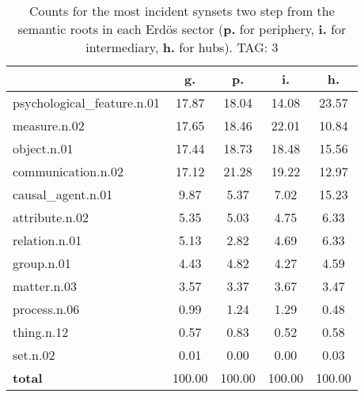\begin{table}[h!]
\begin{center}
\begin{tabular}{| l | c | c | c | c |}\hline
 & g. & p. & i. & h. \\\hline
psychological\_feature.n.01 & 17.87  & 18.04  & 14.08  & 23.57 \\\hline
measure.n.02 & 17.65  & 18.46  & 22.01  & 10.84 \\\hline
object.n.01 & 17.44  & 18.73  & 18.48  & 15.56 \\\hline
communication.n.02 & 17.12  & 21.28  & 19.22  & 12.97 \\\hline
causal\_agent.n.01 & 9.87  & 5.37  & 7.02  & 15.23 \\\hline
attribute.n.02 & 5.35  & 5.03  & 4.75  & 6.33 \\\hline
relation.n.01 & 5.13  & 2.82  & 4.69  & 6.33 \\\hline
group.n.01 & 4.43  & 4.82  & 4.27  & 4.59 \\\hline
matter.n.03 & 3.57  & 3.37  & 3.67  & 3.47 \\\hline
process.n.06 & 0.99  & 1.24  & 1.29  & 0.48 \\\hline
thing.n.12 & 0.57  & 0.83  & 0.52  & 0.58 \\\hline
set.n.02 & 0.01  & 0.00  & 0.00  & 0.03 \\\hline
{{\bf total}} & 100.00  & 100.00  & 100.00  & 100.00 \\\hline
\end{tabular}
\caption{Counts for the most incident synsets two step from the semantic roots in each Erd\"os sector ({\bf p.} for periphery, {\bf i.} for intermediary, {\bf h.} for hubs). TAG: 3}
\end{center}
\end{table}